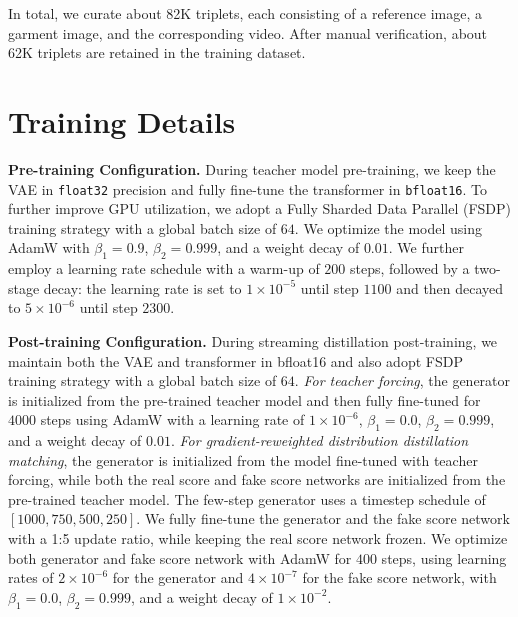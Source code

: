 In total, we curate about 82K triplets, each consisting of a reference image, a garment image, and the corresponding video. After manual verification, about 62K triplets are retained in the training dataset.



\section{Training Details}
%
\noindent
\textbf{Pre-training Configuration.}
% 
During teacher model pre-training, we keep the VAE in \texttt{float32} precision and fully fine-tune the transformer in \texttt{bfloat16}. 
To further improve GPU utilization, we adopt a Fully Sharded Data Parallel (FSDP) training strategy with a global batch size of $64$.
We optimize the model using AdamW with $\beta_1=0.9$, $\beta_2=0.999$, and a weight decay of $0.01$. 
We further employ a learning rate schedule with a warm-up of $200$ steps, followed by a two-stage decay: the learning rate is set to $1\times10^{-5}$ until step $1100$ and then decayed to $5\times10^{-6}$ until step $2300$.
%



\noindent
\textbf{Post-training Configuration.}
% 
During streaming distillation post-training, we maintain both the VAE and transformer in bfloat16 and also adopt FSDP training strategy with a global batch size of $64$.
% 
\textit{For teacher forcing}, the generator is initialized from the pre-trained teacher model and then fully fine-tuned for $4000$ steps using AdamW with a learning rate of $1\times10^{-6}$, $\beta_1=0.0$, $\beta_2=0.999$, and a weight decay of $0.01$.
% 
\textit{For gradient-reweighted distribution distillation matching}, the generator is initialized from the model fine-tuned with teacher forcing, while both the real score and fake score networks are initialized from the pre-trained teacher model. The few-step generator uses a timestep schedule of $[1000, 750, 500, 250]$. 
We fully fine-tune the generator and the fake score network with a 1:5 update ratio, while keeping the real score network frozen.
We optimize both generator and fake score network with AdamW for $400$ steps, using learning rates of $2\times10^{-6}$ for the generator and $4\times10^{-7}$ for the fake score network, with $\beta_1=0.0$, $\beta_2=0.999$, and a weight decay of $1\times10^{-2}$.




